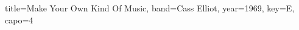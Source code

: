 \documentclass{../../tex/bekki-leadsheet}
\begin{document}
\begin{song}[transpose-capo=true]{title={Make Your Own Kind Of Music}, band={Cass Elliot}, year={1969}, key={E}, capo={4}}

  

\end{song}
\end{document}
